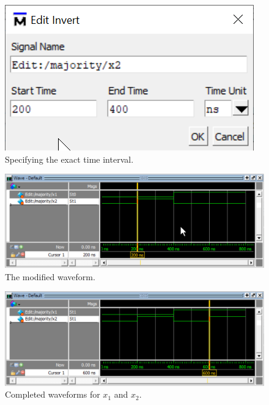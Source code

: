 \documentclass[11pt, twoside, pdftex]{article}
\begin{document}
\begin{figure}[H]
   \begin{center}
      \includegraphics[scale=1.0]{figures/figure17.png}
   \caption{Specifying the exact time interval.} 
	 \label{fig:17}
	 \end{center}
\end{figure}

\begin{figure}[H]
   \begin{center}
      \includegraphics[scale=1.0]{figures/figure18.png}
   \caption{The modified waveform.} 
	 \label{fig:18}
	 \end{center}
\end{figure}

\begin{figure}[H]
   \begin{center}
      \includegraphics[scale=1.0]{figures/figure19.png}
   \caption{Completed waveforms for $x_1$ and $x_2$.} 
	 \label{fig:19}
	 \end{center}
\end{figure}
\end{document}
